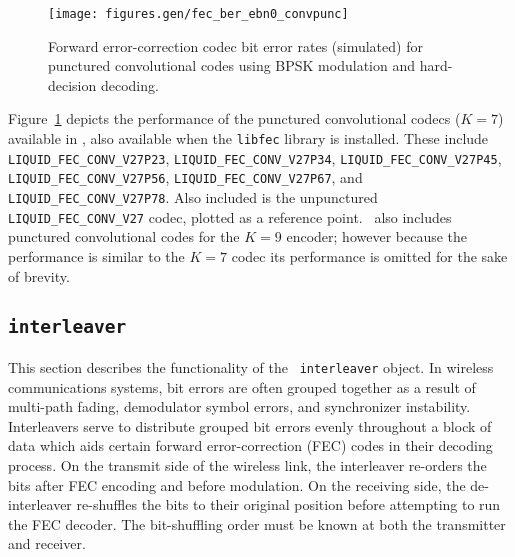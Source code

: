 \begin{figure}
\centering
\texttt{[image: figures.gen/fec\_ber\_ebn0\_convpunc]}
\caption{Forward error-correction codec bit error rates (simulated)
         for punctured convolutional codes
         using BPSK modulation and hard-decision decoding.}
\label{fig:fec:convpunc_ber}
\end{figure}
%
Figure~\ref{fig:fec:convpunc_ber} depicts the performance of the
punctured convolutional codecs ($K=7$) available in \liquid,
also available when the {\tt libfec} library is installed.
These include
{\tt LIQUID\_FEC\_CONV\_V27P23},
{\tt LIQUID\_FEC\_CONV\_V27P34},
{\tt LIQUID\_FEC\_CONV\_V27P45},
{\tt LIQUID\_FEC\_CONV\_V27P56},
{\tt LIQUID\_FEC\_CONV\_V27P67}, and
{\tt LIQUID\_FEC\_CONV\_V27P78}.
Also included is the unpunctured {\tt LIQUID\_FEC\_CONV\_V27} codec,
plotted as a reference point.
\liquid\ also includes punctured convolutional codes for the $K=9$
encoder;
however because the performance is similar to the $K=7$ codec
its performance is omitted for the sake of brevity.


% 
%
\subsection{{\tt interleaver}}
\label{module:fec:interleaver}
This section describes the functionality of the \liquid\ {\tt interleaver}
object.
In wireless communications systems, bit errors are often grouped together as a
result of multi-path fading, demodulator symbol errors, and synchronizer
instability.
Interleavers serve to distribute grouped bit errors evenly throughout a block
of data which aids certain forward error-correction (FEC) codes in their
decoding process.
On the transmit side of the wireless link, the interleaver re-orders the bits
after FEC encoding and before modulation.
On the receiving side, the de-interleaver re-shuffles the bits to their
original position before attempting to run the FEC decoder.
The bit-shuffling order must be known at both the transmitter and receiver.

